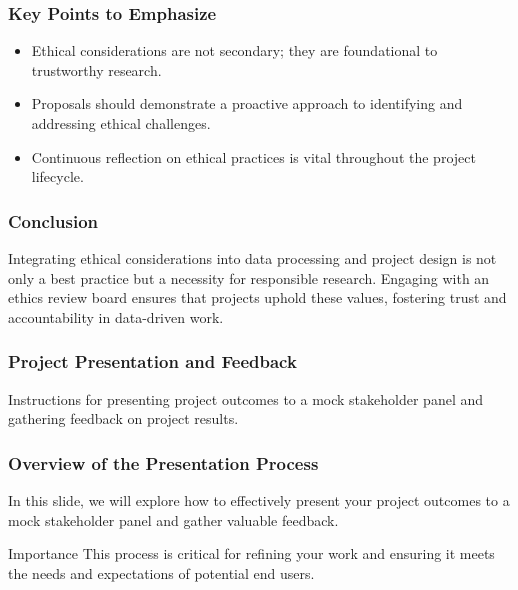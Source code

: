 \documentclass{beamer}
\begin{document}
\begin{frame}[fragile]
    \frametitle{Key Points to Emphasize}
    
    \begin{itemize}
        \item Ethical considerations are not secondary; they are foundational to trustworthy research.
        \item Proposals should demonstrate a proactive approach to identifying and addressing ethical challenges.
        \item Continuous reflection on ethical practices is vital throughout the project lifecycle.
    \end{itemize}
\end{frame}

\begin{frame}[fragile]
    \frametitle{Conclusion}
    Integrating ethical considerations into data processing and project design is not only a best practice but a necessity for responsible research. Engaging with an ethics review board ensures that projects uphold these values, fostering trust and accountability in data-driven work.
\end{frame}

\begin{frame}[fragile]
    \frametitle{Project Presentation and Feedback}
    Instructions for presenting project outcomes to a mock stakeholder panel and gathering feedback on project results.
\end{frame}

\begin{frame}[fragile]
    \frametitle{Overview of the Presentation Process}
    In this slide, we will explore how to effectively present your project outcomes to a mock stakeholder panel and gather valuable feedback.
    
    \begin{block}{Importance}
        This process is critical for refining your work and ensuring it meets the needs and expectations of potential end users.
    \end{block}
\end{frame}
\end{document}
